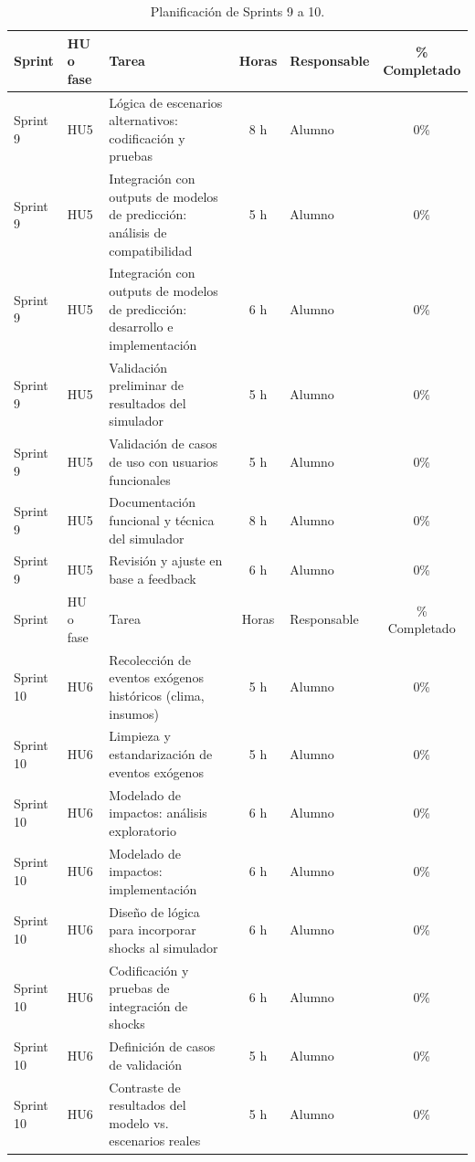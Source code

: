 \documentclass[
11pt, %
]{charter}
\begin{document}
\begin{table}[htpb]
\centering
\caption{Planificación de Sprints 9 a 10.}
\begin{tabularx}{\linewidth}{@{}|l|l|X|c|l|c|@{}}
\hline
\rowcolor[HTML]{C0C0C0}
Sprint & HU o fase & Tarea & Horas & Responsable & \% Completado \\ \hline
Sprint 9 & HU5 & Lógica de escenarios alternativos: codificación y pruebas & 8 h & Alumno & 0\% \\ \hline
Sprint 9 & HU5 & Integración con outputs de modelos de predicción: análisis de compatibilidad & 5 h & Alumno & 0\% \\ \hline
Sprint 9 & HU5 & Integración con outputs de modelos de predicción: desarrollo e implementación & 6 h & Alumno & 0\% \\ \hline
Sprint 9 & HU5 & Validación preliminar de resultados del simulador & 5 h & Alumno & 0\% \\ \hline
Sprint 9 & HU5 & Validación de casos de uso con usuarios funcionales & 5 h & Alumno & 0\% \\ \hline
Sprint 9 & HU5 & Documentación funcional y técnica del simulador & 8 h & Alumno & 0\% \\ \hline
Sprint 9 & HU5 & Revisión y ajuste en base a feedback & 6 h & Alumno & 0\% \\ \hline
\hline
Sprint & HU o fase & Tarea & Horas & Responsable & \% Completado \\ \hline
Sprint 10 & HU6 & Recolección de eventos exógenos históricos (clima, insumos) & 5 h & Alumno & 0\% \\ \hline
Sprint 10 & HU6 & Limpieza y estandarización de eventos exógenos & 5 h & Alumno & 0\% \\ \hline
Sprint 10 & HU6 & Modelado de impactos: análisis exploratorio & 6 h & Alumno & 0\% \\ \hline
Sprint 10 & HU6 & Modelado de impactos: implementación & 6 h & Alumno & 0\% \\ \hline
Sprint 10 & HU6 & Diseño de lógica para incorporar shocks al simulador & 6 h & Alumno & 0\% \\ \hline
Sprint 10 & HU6 & Codificación y pruebas de integración de shocks & 6 h & Alumno & 0\% \\ \hline
Sprint 10 & HU6 & Definición de casos de validación & 5 h & Alumno & 0\% \\ \hline
Sprint 10 & HU6 & Contraste de resultados del modelo vs. escenarios reales & 5 h & Alumno & 0\% \\ \hline
\end{tabularx}
\end{table}
\end{document}
